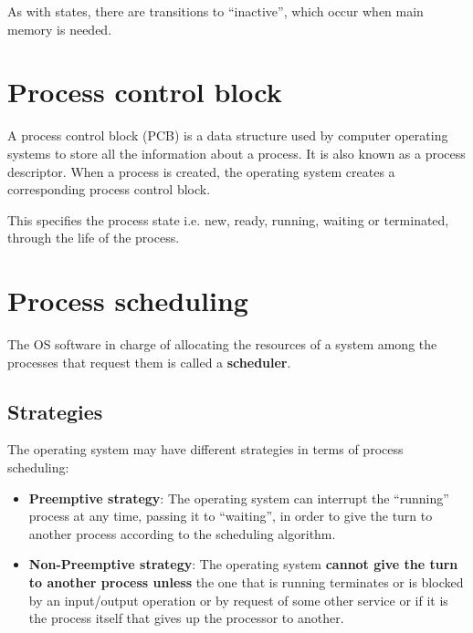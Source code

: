 As with states, there are transitions to “inactive”, which occur when main memory is needed.

\section{Process control block}

A process control block (PCB) is a data structure used by computer operating systems to store all the information about a process. It is also known as a process descriptor. When a process is created, the operating system creates a corresponding process control block.

This specifies the process state i.e. new, ready, running, waiting or terminated, through the life of the process.



\section{Process scheduling}

The OS software in charge of allocating the resources of a system among the processes that request them is called a \textbf{scheduler}.


\subsection{Strategies}
The operating system may have different strategies in terms of process scheduling:

\begin{itemize}
    \item \textbf{Preemptive strategy}: The operating system can interrupt the “running” process at any time, passing it to “waiting”, in order to give the turn to another process according to the scheduling algorithm.

    \item \textbf{Non-Preemptive strategy}: The operating system \textbf{cannot give the turn to another process unless} the one that is running terminates or is blocked by an input/output operation or by request of some other service or if it is the process itself that gives up the processor to another.
\end{itemize}

